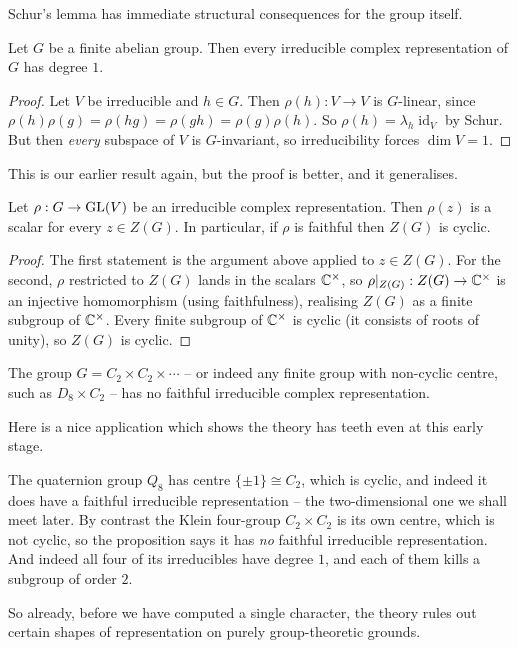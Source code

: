 \documentclass[a4paper]{scrartcl}
\newcommand{\id}{\operatorname{id}}
\begin{document}
Schur's lemma has immediate structural consequences for the group itself.

\begin{corollary}
	Let $G$ be a finite abelian group. Then every irreducible complex representation of $G$ has degree $1$.
\end{corollary}
\begin{proof}
	Let $V$ be irreducible and $h \in G$. Then $\rho(h) : V \to V$ is $G$-linear, since $\rho(h)\rho(g) = \rho(hg) = \rho(gh) = \rho(g)\rho(h)$. So $\rho(h) = \lambda_h \id_V$ by Schur. But then \emph{every} subspace of $V$ is $G$-invariant, so irreducibility forces $\dim V = 1$.
\end{proof}

This is our earlier result again, but the proof is better, and it generalises.

\begin{proposition}
	Let $\rho: G \to \operatorname{GL}(V)$ be an irreducible complex representation. Then $\rho(z)$ is a scalar for every $z \in Z(G)$. In particular, if $\rho$ is faithful then $Z(G)$ is cyclic.
\end{proposition}
\begin{proof}
	The first statement is the argument above applied to $z \in Z(G)$. For the second, $\rho$ restricted to $Z(G)$ lands in the scalars $\mathbb{C}^\times$, so $\rho|_{Z(G)} : Z(G) \to \mathbb{C}^\times$ is an injective homomorphism (using faithfulness), realising $Z(G)$ as a finite subgroup of $\mathbb{C}^\times$. Every finite subgroup of $\mathbb{C}^\times$ is cyclic (it consists of roots of unity), so $Z(G)$ is cyclic.
\end{proof}

\begin{corollary}
	The group $G = C_2 \times C_2 \times \cdots$ -- or indeed any finite group with non-cyclic centre, such as $D_8 \times C_2$ -- has no faithful irreducible complex representation.
\end{corollary}

Here is a nice application which shows the theory has teeth even at this early stage.

\begin{example}
	The quaternion group $Q_8$ has centre $\{\pm1\}\cong C_2$, which is cyclic, and indeed it does have a faithful irreducible representation -- the two-dimensional one we shall meet later. By contrast the Klein four-group $C_2\times C_2$ is its own centre, which is not cyclic, so the proposition says it has \emph{no} faithful irreducible representation. And indeed all four of its irreducibles have degree $1$, and each of them kills a subgroup of order $2$.

	So already, before we have computed a single character, the theory rules out certain shapes of representation on purely group-theoretic grounds.
\end{example}
\end{document}
